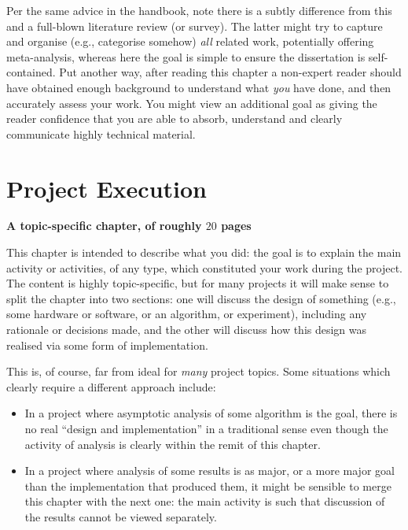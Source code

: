 \documentclass[ %
                    author={Jonathan Rankin},
                supervisor={Dr. David May, Dr. Ian Holyer},
                    degree={MEng},
                     title={CodeTouch},
                  subtitle={A Revolutionary Way To Program Real Code On Touch Screen Devices},
                      type={enterprise},
                      year={2015 } ]{dissertation}
\begin{document}
Per the same advice in the handbook, note there is a subtly difference from
this and a full-blown literature review (or survey).  The latter might try
to capture and organise (e.g., categorise somehow) {\em all} related work,
potentially offering meta-analysis, whereas here the goal is simple to
ensure the dissertation is self-contained.  Put another way, after reading 
this chapter a non-expert reader should have obtained enough background to 
understand what {\em you} have done, and then accurately assess your work.
You might view an additional goal as giving the reader confidence that you 
are able to absorb, understand and clearly communicate highly technical 
material.


\chapter{Project Execution}
\label{chap:execution}

{\bf A topic-specific chapter, of roughly $20$ pages} 
\vspace{1cm} 

\noindent
This chapter is intended to describe what you did: the goal is to explain
the main activity or activities, of any type, which constituted your work 
during the project.  The content is highly topic-specific, but for many 
projects it will make sense to split the chapter into two sections: one 
will discuss the design of something (e.g., some hardware or software, or 
an algorithm, or experiment), including any rationale or decisions made, 
and the other will discuss how this design was realised via some form of 
implementation.  

This is, of course, far from ideal for {\em many} project topics.  Some
situations which clearly require a different approach include:

\begin{itemize}
\item In a project where asymptotic analysis of some algorithm is the goal,
      there is no real ``design and implementation'' in a traditional sense
      even though the activity of analysis is clearly within the remit of
      this chapter.
\item In a project where analysis of some results is as major, or a more
      major goal than the implementation that produced them, it might be
      sensible to merge this chapter with the next one: the main activity 
      is such that discussion of the results cannot be viewed separately.
\end{itemize}
\end{document}
